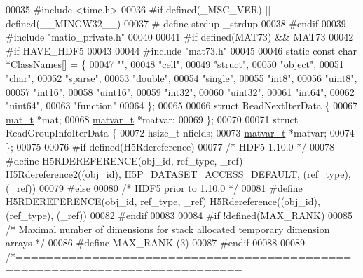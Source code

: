 \begin{DoxyCode}
00035 \textcolor{preprocessor}{#include <time.h>}
00036 \textcolor{preprocessor}{#if defined(\_MSC\_VER) || defined(\_\_MINGW32\_\_)}
00037 \textcolor{preprocessor}{#   define strdup \_strdup}
00038 \textcolor{preprocessor}{#endif}
00039 \textcolor{preprocessor}{#include "matio\_private.h"}
00040 
00041 \textcolor{preprocessor}{#if defined(MAT73) && MAT73}
00042 \textcolor{preprocessor}{#if HAVE\_HDF5}
00043 
00044 \textcolor{preprocessor}{#include "mat73.h"}
00045 
00046 \textcolor{keyword}{static} \textcolor{keyword}{const} \textcolor{keywordtype}{char} *ClassNames[] = \{
00047     \textcolor{stringliteral}{""},
00048     \textcolor{stringliteral}{"cell"},
00049     \textcolor{stringliteral}{"struct"},
00050     \textcolor{stringliteral}{"object"},
00051     \textcolor{stringliteral}{"char"},
00052     \textcolor{stringliteral}{"sparse"},
00053     \textcolor{stringliteral}{"double"},
00054     \textcolor{stringliteral}{"single"},
00055     \textcolor{stringliteral}{"int8"},
00056     \textcolor{stringliteral}{"uint8"},
00057     \textcolor{stringliteral}{"int16"},
00058     \textcolor{stringliteral}{"uint16"},
00059     \textcolor{stringliteral}{"int32"},
00060     \textcolor{stringliteral}{"uint32"},
00061     \textcolor{stringliteral}{"int64"},
00062     \textcolor{stringliteral}{"uint64"},
00063     \textcolor{stringliteral}{"function"}
00064 \};
00065 
00066 \textcolor{keyword}{struct }ReadNextIterData \{
00067     \hyperlink{struct__mat__t}{mat\_t} *mat;
00068     \hyperlink{group___m_a_t_structmatvar__t}{matvar\_t} *matvar;
00069 \};
00070 
00071 \textcolor{keyword}{struct }ReadGroupInfoIterData \{
00072     hsize\_t nfields;
00073     \hyperlink{group___m_a_t_structmatvar__t}{matvar\_t} *matvar;
00074 \};
00075 
00076 \textcolor{preprocessor}{#if defined(H5Rdereference)}
00077 \textcolor{comment}{/* HDF5 1.10.0 */}
00078 \textcolor{preprocessor}{#define H5RDEREFERENCE(obj\_id, ref\_type, \_ref) H5Rdereference2((obj\_id), H5P\_DATASET\_ACCESS\_DEFAULT,
       (ref\_type), (\_ref))}
00079 \textcolor{preprocessor}{#else}
00080 \textcolor{comment}{/* HDF5 prior to 1.10.0 */}
00081 \textcolor{preprocessor}{#define H5RDEREFERENCE(obj\_id, ref\_type, \_ref) H5Rdereference((obj\_id), (ref\_type), (\_ref))}
00082 \textcolor{preprocessor}{#endif}
00083 
00084 \textcolor{preprocessor}{#if !defined(MAX\_RANK)}
00085 \textcolor{comment}{/* Maximal number of dimensions for stack allocated temporary dimension arrays */}
00086 \textcolor{preprocessor}{#define MAX\_RANK (3)}
00087 \textcolor{preprocessor}{#endif}
00088 
00089 \textcolor{comment}{/*===========================================================================}

\end{DoxyCode}
